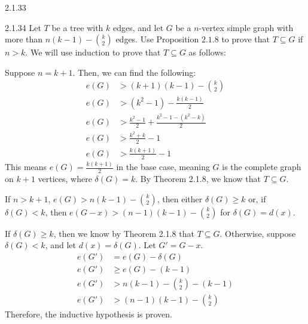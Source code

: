 \documentclass[10pt]{extarticle}
\begin{document}
{\begin{problem}{2.1.33}
\begin{description}[font=\normalfont\scshape]
  \end{description}
\end{problem}
\begin{problem}{2.1.34}
  Let $T$ be a tree with $k$ edges, and let $G$ be a $n$-vertex simple graph with more than $n(k-1)-{ k \choose 2 }$ edges. Use Proposition $2.1.8$ to prove that $T\subseteq G$ if $n>k$.
  \tcblower
  We will use induction to prove that $T\subseteq G$ as follows:
  \begin{description}[font = \normalfont\scshape]
    \item[Base Case] Suppose $n = k+1$. Then, we can find the following:
      \begin{align*}
        e(G) &> (k+1)(k-1) - {k\choose 2}\\
        e(G) &> (k^2-1) - \frac{k(k-1)}{2}\\
        e(G) &> \frac{k^2 - 1}{2} + \frac{k^2-1 - (k^2-k)}{2} \\
        e(G) &> \frac{k^2 + k}{2} - 1\\
        e(G) &> \frac{k(k+1)}{2} - 1
      \end{align*}
      This means $e(G) = \frac{k(k+1)}{2}$ in the base case, meaning $G$ is the complete graph on $k+1$ vertices, where $\delta(G) = k$. By Theorem 2.1.8, we know that $T\subseteq G$.
    \item[Inductive Hypothesis] If $n > k+1$, $e(G) > n(k-1) - {k\choose 2}$, then either $\delta(G) \geq k$ or, if $\delta(G) < k$, then $e(G-x) > (n-1)(k-1) - {k\choose 2}$ for $\delta(G) = d(x)$.
    \item[Proof] If $\delta(G) \geq k$, then we know by Theorem 2.1.8 that $T\subseteq G$. Otherwise, suppose $\delta(G) < k$, and let $d(x) = \delta(G)$. Let $G' = G-x$.
      \begin{align*}
        e(G') &= e(G) - \delta(G)\\
        e(G') &\geq e(G) - (k-1) \\
        e(G') &> n(k-1) - {k\choose 2} - (k-1) \\
        e(G') &> (n-1)(k-1) - {k\choose 2}
      \end{align*}
      Therefore, the inductive hypothesis is proven.
  \end{description}
\end{problem}
}
\end{document}
